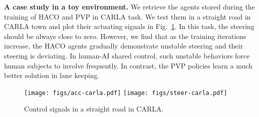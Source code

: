 




\textbf{A case study in a toy environment.}
We retrieve the agents stored during the training of HACO and PVP in CARLA task. We test them in a straight road in CARLA town and plot their actuating signals in Fig.~\ref{fig:carla-extra}.
In this task, the steering should be always close to zero. However, we find that as the training iterations increase, the HACO agents gradually demonstrate unstable steering and their steering is deviating.  
In human-AI shared control, such unstable behaviors force human subjects to involve frequently. In contrast, the PVP policies learn a much better solution in lane keeping.



\begin{figure}[H]
\centering
         \centering
         \texttt{[image: figs/acc-carla.pdf]}
        \hspace{30pt}
         \texttt{[image: figs/steer-carla.pdf]}
\vspace{-1em}
\caption{
Control signals in a straight road in CARLA.
}
\vspace{-1em}
\label{fig:carla-extra}
\end{figure}


